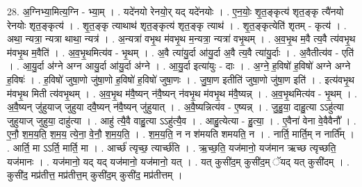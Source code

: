 \documentclass[17pt]{extarticle}
\begin{document}
28. अ॒ग्निभ्या॒मित्य॒ग्नि - भ्या॒म् । . यदे॑नयो रेनयो॒र् यद् यदे॑नयोः । . ए॒न॒योः॒ शृ॒त॒ङ्कृत्य॑ शृत॒ङ्कृ त्यै॑नयो रेनयोः शृत॒ङ्कृत्य॑ । . शृ॒त॒ङ्कृ त्याथाथ॑ शृत॒ङ्कृत्य॑ शृत॒ङ्कृ त्याथ॑ । . शृ॒त॒ङ्कृत्येति॑ शृतम् - कृत्य॑ । . अथा॒ न्यत्रा॒ न्यत्रा थाथा॒ न्यत्र॑ । . अ॒न्यत्रा॑ वभृ॒थ म॑वभृ॒थ म॒न्यत्रा॒ न्यत्रा॑ वभृ॒थम् । . अ॒व॒भृ॒थ म॒वै त्य॒वै त्य॑वभृ॒थ म॑वभृ॒थ म॒वैति॑ । . अ॒व॒भृ॒थमित्य॑व - भृ॒थम् । . अ॒वै त्या॑यु॒र्दा आ॑यु॒र्दा अ॒वै त्य॒वै त्या॑यु॒र्दाः । . अ॒वैतीत्य॑व - एति॑ । . आ॒यु॒र्दा अ॑ग्ने अग्न आयु॒र्दा आ॑यु॒र्दा अ॑ग्ने । . आ॒यु॒र्दा इत्या॑युः - दाः । . अ॒ग्ने॒ ह॒विषो॑ ह॒विषो॑ अग्ने अग्ने ह॒विषः॑ । . ह॒विषो॑ जुषा॒णो जु॑षा॒णो ह॒विषो॑ ह॒विषो॑ जुषा॒णः । . जु॒षा॒ण इतीति॑ जुषा॒णो जु॑षा॒ण इति॑ । . इत्य॑वभृ॒थ म॑वभृ॒थ मिती त्य॑वभृ॒थम् । . अ॒व॒भृ॒थ म॑वै॒ष्यन् न॑वै॒ष्यन् न॑वभृ॒थ म॑वभृ॒थ म॑वै॒ष्यन्न् । . अ॒व॒भृ॒थमित्य॑व - भृ॒थम् । . अ॒वै॒ष्यन् जु॑हुयाज् जुहुया दवै॒ष्यन् न॑वै॒ष्यन् जु॑हुयात् । . अ॒वै॒ष्यन्नित्य॑व - ए॒ष्यन्न् । . जु॒हु॒या॒ दाहु॒त्या ऽऽहु॑त्या जुहुयाज् जुहुया॒ दाहु॑त्या । . आहु॑ त्यै॒वै वाहु॒त्या ऽऽहु॑त्यै॒व । . आहु॒त्येत्या - हु॒त्या॒ । . ए॒वैना॑ वेना वे॒वैवैनौ᳚ । . ए॒नौ॒ श॒म॒य॒ति॒ श॒म॒य॒ त्ये॒ना॒ वे॒नौ॒ श॒म॒य॒ति॒ । . श॒म॒य॒ति॒ न न श॑मयति शमयति॒ न । . नार्ति॒ मार्ति॒म् न नार्ति᳚म् । . आर्ति॒ मा ऽऽर्ति॒ मार्ति॒ मा । . आर्च्छ॑ त्यृच्छ॒ त्यार्च्छ॑ति । . ऋ॒च्छ॒ति॒ यज॑मानो॒ यज॑मान ऋच्छ त्यृच्छति॒ यज॑मानः । . यज॑मानो॒ यद् यद् यज॑मानो॒ यज॑मानो॒ यत् । . यत् कुसी॑द॒म् कुसी॑द॒म् ॅयद् यत् कुसी॑दम् । . कुसी॑द॒ मप्र॑तीत्त॒ मप्र॑तीत्त॒म् कुसी॑द॒म् कुसी॑द॒ मप्र॑तीत्तम् । \newline
\end{document}

